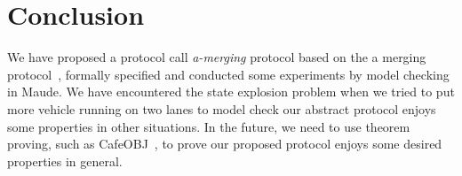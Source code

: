 \documentclass[10pt, conference, compsocconf]{IEEEtran}
\begin{document}
 








\section{Conclusion}
\label{concl_sect}

We have proposed a protocol call \textit{a-merging} protocol based on the a merging protocol~\cite{10.1145/3055004.3055028}, formally specified and conducted some experiments by model checking in Maude.
We have encountered the state explosion problem when we tried to put more vehicle running on two lanes to model check our abstract protocol enjoys some properties in other situations.
In the future, we need to use theorem proving, such as CafeOBJ~\cite{DiaconescuF98}, to prove our proposed protocol enjoys some desired properties in general.



%
%

\end{document}
